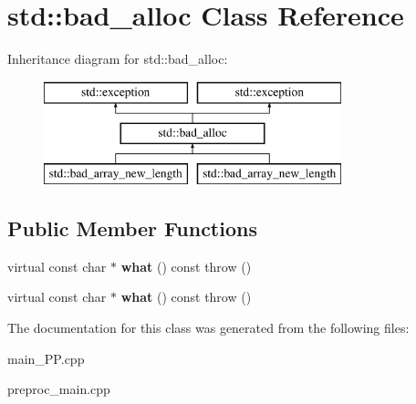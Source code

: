 \hypertarget{classstd_1_1bad__alloc}{\section{std\+:\+:bad\+\_\+alloc Class Reference}
\label{classstd_1_1bad__alloc}
}
Inheritance diagram for std\+:\+:bad\+\_\+alloc\+:\begin{figure}[H]
\begin{center}
\leavevmode
\includegraphics[height=3.000000cm]{classstd_1_1bad__alloc}
\end{center}
\end{figure}
\subsection*{Public Member Functions}
\begin{DoxyCompactItemize}
\item 
\hypertarget{classstd_1_1bad__alloc_a6e36015d13822361895a275c6b4d1720}{virtual const char $\ast$ {\bfseries what} () const   throw ()}\label{classstd_1_1bad__alloc_a6e36015d13822361895a275c6b4d1720}

\item 
\hypertarget{classstd_1_1bad__alloc_a6e36015d13822361895a275c6b4d1720}{virtual const char $\ast$ {\bfseries what} () const   throw ()}\label{classstd_1_1bad__alloc_a6e36015d13822361895a275c6b4d1720}

\end{DoxyCompactItemize}


The documentation for this class was generated from the following files\+:\begin{DoxyCompactItemize}
\item 
main\+\_\+\+P\+P.\+cpp\item 
preproc\+\_\+main.\+cpp\end{DoxyCompactItemize}
